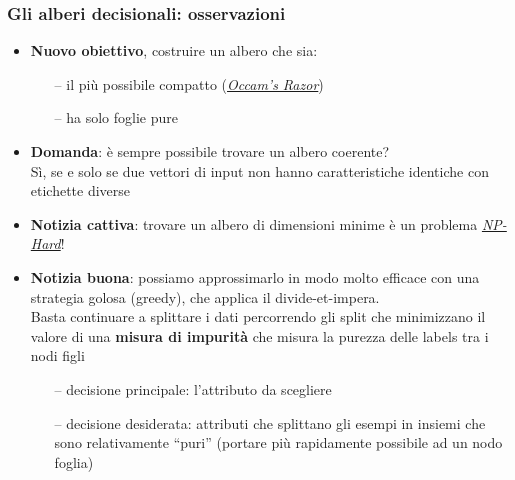 \begin{frame}
	
	\frametitle{Gli alberi decisionali: osservazioni}
	
	\begin{itemize}
		\item \textbf{Nuovo obiettivo}, costruire un albero che sia:
			\begin{itemize}
				\item[--] il più possibile compatto (\href{https://it.wikipedia.org/wiki/Rasoio\_di\_Occam}{\textit{Occam's Razor}})
				\item[--] ha solo foglie pure
			\end{itemize}
		\pause
		\item \textbf{Domanda}: è sempre possibile trovare un albero coerente?\\
			Sì, se e solo se due vettori di input non hanno caratteristiche identiche con etichette diverse
		\pause
		\item \textbf{Notizia cattiva}: trovare un albero di dimensioni minime è un problema \href{https://it.wikipedia.org/wiki/NP-difficile}{\textit{NP-Hard}}!
		\pause
		\item \textbf{Notizia buona}: possiamo approssimarlo in modo molto efficace con una strategia golosa (greedy), che applica il divide-et-impera.\\
			Basta continuare a splittare i dati percorrendo gli split che minimizzano il valore di una \textbf{misura di impurità} che misura la purezza delle labels tra i nodi figli
				\begin{itemize}
					\item[--] decisione principale: l'attributo da scegliere
					\item[--] decisione desiderata: attributi che splittano gli esempi in insiemi che sono relativamente ``puri'' (portare più rapidamente possibile ad un nodo foglia)
				\end{itemize}
	\end{itemize}
	
\end{frame}


